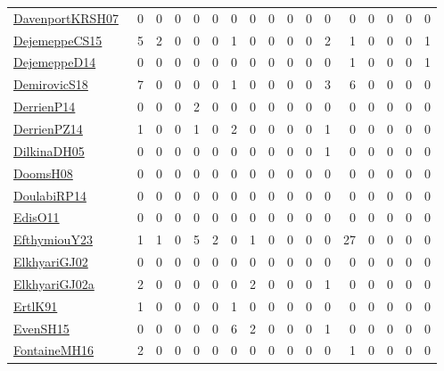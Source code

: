 {\begin{longtable}{l*{16}{r}}
\href{papers/DavenportKRSH07.pdf}{DavenportKRSH07}~\cite{DavenportKRSH07} & 0 & 0 & 0 & 0 & 0 & 0 & 0 & 0 & 0 & 0 & 0 & 0 & 0 & 0 & 0 & 0\\
\href{papers/DejemeppeCS15.pdf}{DejemeppeCS15}~\cite{DejemeppeCS15} & 5 & 2 & 0 & 0 & 0 & 1 & 0 & 0 & 0 & 0 & 2 & 1 & 0 & 0 & 0 & 1\\
\href{papers/DejemeppeD14.pdf}{DejemeppeD14}~\cite{DejemeppeD14} & 0 & 0 & 0 & 0 & 0 & 0 & 0 & 0 & 0 & 0 & 0 & 1 & 0 & 0 & 0 & 1\\
\href{papers/DemirovicS18.pdf}{DemirovicS18}~\cite{DemirovicS18} & 7 & 0 & 0 & 0 & 0 & 1 & 0 & 0 & 0 & 0 & 3 & 6 & 0 & 0 & 0 & 0\\
\href{papers/DerrienP14.pdf}{DerrienP14}~\cite{DerrienP14} & 0 & 0 & 0 & 2 & 0 & 0 & 0 & 0 & 0 & 0 & 0 & 0 & 0 & 0 & 0 & 0\\
\href{papers/DerrienPZ14.pdf}{DerrienPZ14}~\cite{DerrienPZ14} & 1 & 0 & 0 & 1 & 0 & 2 & 0 & 0 & 0 & 0 & 1 & 0 & 0 & 0 & 0 & 0\\
\href{papers/DilkinaDH05.pdf}{DilkinaDH05}~\cite{DilkinaDH05} & 0 & 0 & 0 & 0 & 0 & 0 & 0 & 0 & 0 & 0 & 1 & 0 & 0 & 0 & 0 & 0\\
\href{papers/DoomsH08.pdf}{DoomsH08}~\cite{DoomsH08} & 0 & 0 & 0 & 0 & 0 & 0 & 0 & 0 & 0 & 0 & 0 & 0 & 0 & 0 & 0 & 0\\
\href{papers/DoulabiRP14.pdf}{DoulabiRP14}~\cite{DoulabiRP14} & 0 & 0 & 0 & 0 & 0 & 0 & 0 & 0 & 0 & 0 & 0 & 0 & 0 & 0 & 0 & 0\\
\href{papers/EdisO11.pdf}{EdisO11}~\cite{EdisO11} & 0 & 0 & 0 & 0 & 0 & 0 & 0 & 0 & 0 & 0 & 0 & 0 & 0 & 0 & 0 & 0\\
\href{papers/EfthymiouY23.pdf}{EfthymiouY23}~\cite{EfthymiouY23} & 1 & 1 & 0 & 5 & 2 & 0 & 1 & 0 & 0 & 0 & 0 & 27 & 0 & 0 & 0 & 0\\
\href{papers/ElkhyariGJ02.pdf}{ElkhyariGJ02}~\cite{ElkhyariGJ02} & 0 & 0 & 0 & 0 & 0 & 0 & 0 & 0 & 0 & 0 & 0 & 0 & 0 & 0 & 0 & 0\\
\href{papers/ElkhyariGJ02a.pdf}{ElkhyariGJ02a}~\cite{ElkhyariGJ02a} & 2 & 0 & 0 & 0 & 0 & 0 & 2 & 0 & 0 & 0 & 1 & 0 & 0 & 0 & 0 & 0\\
\href{papers/ErtlK91.pdf}{ErtlK91}~\cite{ErtlK91} & 1 & 0 & 0 & 0 & 0 & 1 & 0 & 0 & 0 & 0 & 0 & 0 & 0 & 0 & 0 & 0\\
\href{papers/EvenSH15.pdf}{EvenSH15}~\cite{EvenSH15} & 0 & 0 & 0 & 0 & 0 & 6 & 2 & 0 & 0 & 0 & 1 & 0 & 0 & 0 & 0 & 0\\
\href{papers/FontaineMH16.pdf}{FontaineMH16}~\cite{FontaineMH16} & 2 & 0 & 0 & 0 & 0 & 0 & 0 & 0 & 0 & 0 & 0 & 1 & 0 & 0 & 0 & 0\\

\end{longtable}}
